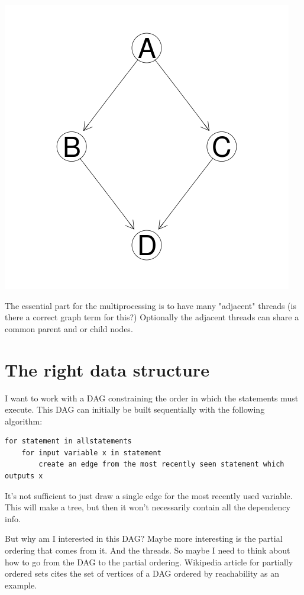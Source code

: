 \documentclass[12pt]{article}
\begin{document}
\centerline{\includegraphics{../codedepends/simple_graph.png}}

The essential part for the multiprocessing is to have many "adjacent"
threads (is there a correct graph term for this?)
Optionally the adjacent threads can share a common parent and or child
nodes.

\section{The right data structure}

I want to work with a DAG constraining the order in which the statements
must execute. This DAG can initially be built sequentially with the following
algorithm:

\begin{verbatim}
for statement in allstatements
    for input variable x in statement
        create an edge from the most recently seen statement which outputs x
\end{verbatim}

It's not sufficient to just draw a single edge for the most recently used
variable. This will make a tree, but then it won't necessarily contain all
the dependency info.

But why am I interested in this DAG? Maybe more interesting is the partial
ordering that comes from it. And the threads. So maybe I need to think
about how to go from the DAG to the partial ordering. Wikipedia article for
partially ordered sets cites the set of vertices of a DAG ordered by
reachability as an example.
\end{document}
